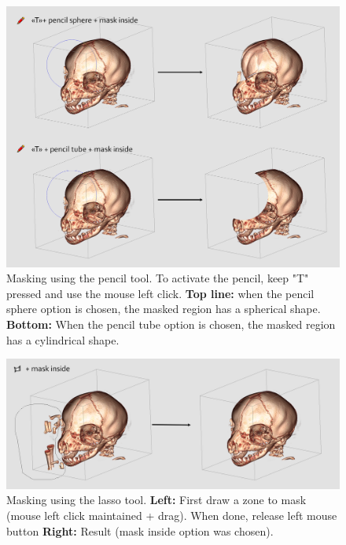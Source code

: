 \begin{figure}
  \centering
  \includegraphics[scale=0.25]{images/14/mask_example/mask_pencil.png}
\caption{Masking using the pencil tool. To activate the pencil, keep "T"  pressed and use the mouse left click. \textbf{Top line:} when the pencil sphere option is  chosen, the masked region has a spherical shape. \textbf{Bottom:} When the pencil tube option is chosen, the masked region has a cylindrical shape.}	 
\label{mask_pencil}
 \end{figure}

\begin{figure}
  \centering
  \includegraphics[scale=0.25]{images/14/mask_example/mask_lasso.png}
\caption{Masking using the lasso tool.  \textbf{Left:} First draw a zone to mask (mouse left click maintained + drag). When done, release left mouse button \textbf{Right:} Result (mask inside option was chosen).}	 
\label{mask_lasso}
 \end{figure}

